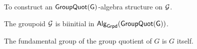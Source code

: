 \begin{problem}
\label{prob:initial_grpd_alg_group_quot}
To construct an $\mathsf{GroupQuot(G)}$-algebra structure on $\mathcal{G}$.
\end{problem}

\begin{proposition}
The groupoid $\mathcal{G}$ is biinitial in $\mathsf{Alg}_{\mathsf{Grpd}}(\mathsf{GroupQuot(G)})$.
\end{proposition}

\begin{corollary}
The fundamental group of the group quotient of $G$ is $G$ itself.
\end{corollary}

